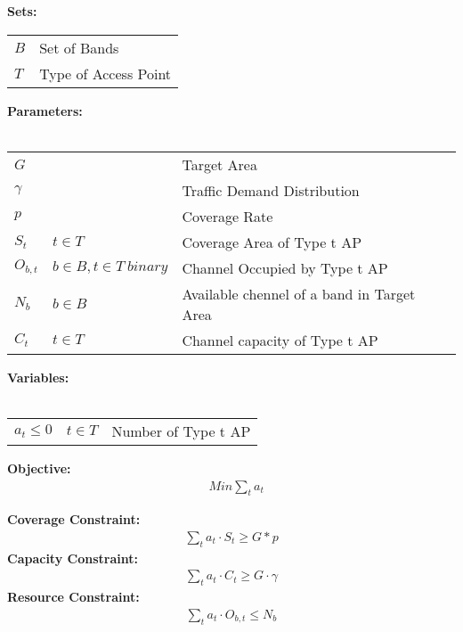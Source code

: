 \noindent
{\bf Sets:}
\begin{tabular}{ll}
$B$ & Set of Bands \\
$T$ & Type of Access Point\\
\end{tabular}

\noindent
{\bf Parameters:}\\
\\
\begin{tabular}{llp{3.4cm}}
$G$ &  & Target Area\\
$\gamma$ & & Traffic Demand Distribution\\
$p$ & & Coverage Rate\\
$S_t$ & $t \in T$ & Coverage Area of Type t AP\\
$O_{b,t}$ & $b \in B, t \in T\ binary$ & Channel Occupied by Type t AP\\
$N_b$ & $b \in B\ $ & Available chennel of a band in Target Area\\
$C_t$ & $t \in T$ & Channel capacity of Type t AP\\
\end{tabular}


\noindent
{\bf Variables:}\\
\\
\begin{tabular}{llr}
$a_t\le0$ & $t \in T$ & Number of Type t AP\\ 
\end{tabular}

\noindent
{\bf Objective:}
\begin{align}
& Min \sum_t a_t
\end{align}

\noindent
{\bf Coverage Constraint:}
\begin{align}
\label{opt:coverage}
\sum_t a_t\cdot S_t \ge G*p
\end{align}
\noindent
{\bf Capacity Constraint:} 
\begin{align}
\label{opt:capacity}
\sum_t a_t\cdot C_t \ge G\cdot \gamma
\end{align}
\noindent
{\bf Resource Constraint:} 
\begin{align}
\label{opt:resource}
\sum_t a_t\cdot O_{b,t} \le N_b
\end{align}

